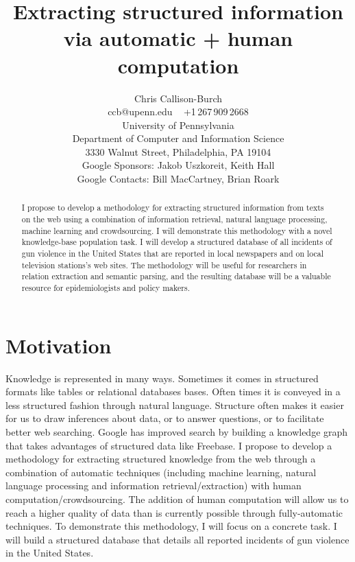 \documentclass[11pt]{article}
\title{Extracting structured information via automatic + human computation}
\author{Chris Callison-Burch \\
 ccb@upenn.edu ~ +1\,267\,909\,2668 \\
 University of Pennsylvania \\
 Department of Computer and Information Science \\
 3330 Walnut Street, Philadelphia, PA 19104 \\
 Google Sponsors: Jakob Uszkoreit, Keith Hall  \\
 Google Contacts: Bill MacCartney, Brian Roark}
\date{}
\begin{document}
\maketitle

\begin{abstract}
I propose to develop a methodology for extracting structured information from texts on the web using a combination of information retrieval, natural language processing, machine learning and crowdsourcing.  I will demonstrate this methodology with a novel knowledge-base population task.  I will develop a structured database of all incidents of gun violence in the United States that are reported in local newspapers and on local television stations's web sites. The methodology will be useful for researchers in relation extraction and semantic parsing, and the resulting database will be a valuable resource for epidemiologists and policy makers. 
\end{abstract}

\section{Motivation}

Knowledge is represented in many ways.  Sometimes it comes in structured formats like tables or relational databases bases.  Often times it is conveyed in a less structured fashion through natural language.  Structure often makes it easier for us to draw inferences about data, or to answer questions, or to facilitate better web searching.  Google has improved search by building a knowledge graph that takes advantages of structured data like Freebase.  I propose to develop a methodology for extracting structured knowledge from the web through a combination of automatic techniques (including machine learning, natural language processing and information retrieval/extraction) with human computation/crowdsourcing.  The addition of human computation will allow us to reach a higher quality of data than is currently possible through fully-automatic techniques. To demonstrate this methodology, I will focus on a concrete task.  I will build a structured database that details all reported incidents of gun violence in the United States.  
\end{document}
